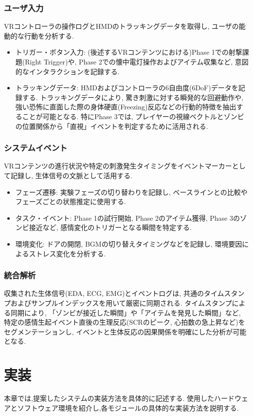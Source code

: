 \documentclass[book,paper=a4,fontsize=10pt,jafontscale=0.92]{jlreq}
\begin{document}
\subsection{ユーザ入力}
VRコントローラの操作ログとHMDのトラッキングデータを取得し, ユーザの能動的な行動を分析する.
\begin{itemize}
    \item トリガー・ボタン入力: (後述するVRコンテンツにおける)Phase 1での射撃課題(Right Trigger)や, Phase 2での懐中電灯操作およびアイテム収集など, 意図的なインタラクションを記録する.
    \item トラッキングデータ: HMDおよびコントローラの6自由度(6DoF)データを記録する. トラッキングデータにより, 驚き刺激に対する瞬発的な回避動作や, 強い恐怖に直面した際の身体硬直(Freezing)反応などの行動的特徴を抽出することが可能となる. 特にPhase 3では, プレイヤーの視線ベクトルとゾンビの位置関係から「直視」イベントを判定するために活用される.
\end{itemize}

\subsection{システムイベント}
VRコンテンツの進行状況や特定の刺激発生タイミングをイベントマーカーとして記録し, 生体信号の文脈として活用する.
\begin{itemize}
\item {フェーズ遷移}: 実験フェーズの切り替わりを記録し, ベースラインとの比較やフェーズごとの状態推定に使用する.
\item {タスク・イベント}: Phase 1の試行開始, Phase 2のアイテム獲得, Phase 3のゾンビ接近など, 感情変化のトリガーとなる瞬間を特定する.
\item {環境変化}: ドアの開閉, BGMの切り替えタイミングなどを記録し, 環境要因によるストレス変化を分析する.
\end{itemize}

\subsection{統合解析}
収集された生体信号(EDA, ECG, EMG)とイベントログは, 共通のタイムスタンプおよびサンプルインデックスを用いて厳密に同期される. タイムスタンプによる同期により, 「ゾンビが接近した瞬間」や「アイテムを発見した瞬間」など, 特定の感情生起イベント直後の生理反応(SCRのピーク, 心拍数の急上昇など)をセグメンテーションし, イベントと生体反応の因果関係を明確にした分析が可能となる.

\chapter{実装}
本章では,提案したシステムの実装方法を具体的に記述する.
使用したハードウェアとソフトウェア環境を紹介し,各モジュールの具体的な実装方法を説明する.
\end{document}
